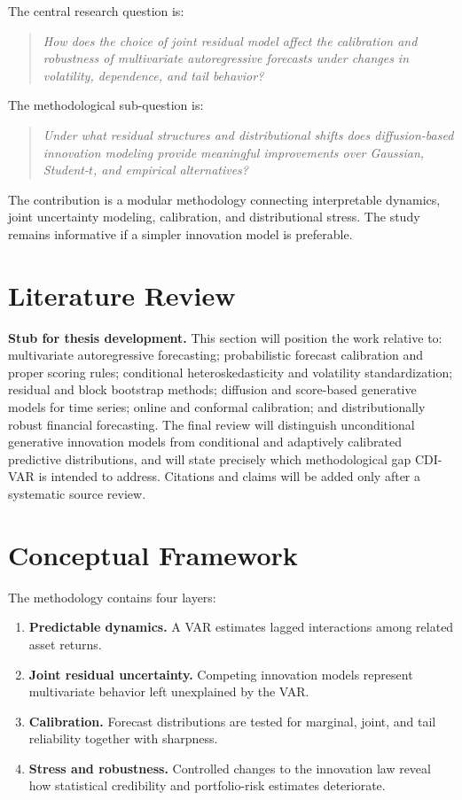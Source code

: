 \documentclass[11pt]{article}
\begin{document}
The central research question is:

\begin{quote}
\emph{How does the choice of joint residual model affect the calibration and robustness of multivariate autoregressive forecasts under changes in volatility, dependence, and tail behavior?}
\end{quote}

The methodological sub-question is:

\begin{quote}
\emph{Under what residual structures and distributional shifts does diffusion-based innovation modeling provide meaningful improvements over Gaussian, Student-$t$, and empirical alternatives?}
\end{quote}

The contribution is a modular methodology connecting interpretable dynamics, joint uncertainty modeling, calibration, and distributional stress. The study remains informative if a simpler innovation model is preferable.

\section{Literature Review}

\textbf{Stub for thesis development.} This section will position the work relative to: multivariate autoregressive forecasting; probabilistic forecast calibration and proper scoring rules; conditional heteroskedasticity and volatility standardization; residual and block bootstrap methods; diffusion and score-based generative models for time series; online and conformal calibration; and distributionally robust financial forecasting. The final review will distinguish unconditional generative innovation models from conditional and adaptively calibrated predictive distributions, and will state precisely which methodological gap CDI-VAR is intended to address. Citations and claims will be added only after a systematic source review.

\section{Conceptual Framework}

The methodology contains four layers:

\begin{enumerate}
    \item \textbf{Predictable dynamics.} A VAR estimates lagged interactions among related asset returns.
    \item \textbf{Joint residual uncertainty.} Competing innovation models represent multivariate behavior left unexplained by the VAR.
    \item \textbf{Calibration.} Forecast distributions are tested for marginal, joint, and tail reliability together with sharpness.
    \item \textbf{Stress and robustness.} Controlled changes to the innovation law reveal how statistical credibility and portfolio-risk estimates deteriorate.
\end{enumerate}
\end{document}
